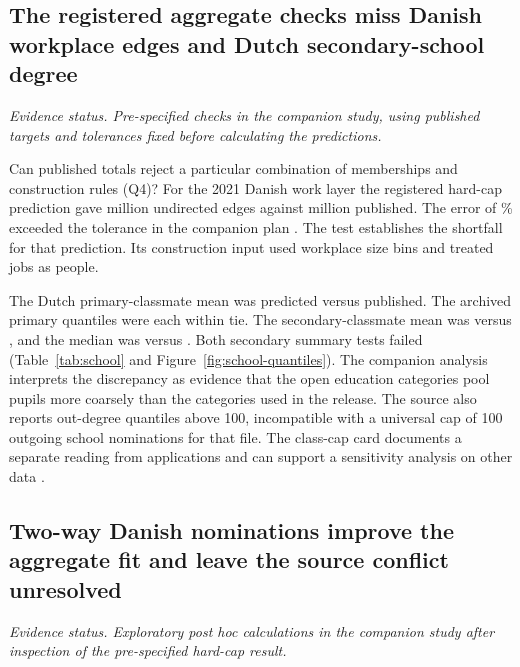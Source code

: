 \subsection{The registered aggregate checks miss Danish workplace edges and Dutch secondary-school degree}
\label{res:registered-aggregates}
\textit{Evidence status. Pre-specified checks in the companion study, using published targets and tolerances fixed before calculating the predictions.}

Can published totals reject a particular combination of memberships and construction rules (Q4)? For the 2021 Danish work layer the registered hard-cap prediction gave \DanishCapped{} million undirected edges against \DanishPublished{} million published. The error of \DanishCappedError\% exceeded the tolerance in the companion plan \citep{cremers2025,almamunpredicting2026}. The test establishes the shortfall for that prediction. Its construction input used workplace size bins and treated jobs as people.

The Dutch primary-classmate mean was \PrimaryMeanPredicted{} predicted versus \PrimaryMeanPublished{} published. The archived primary quantiles were each within \PrimaryMaxQuantileError{} tie. The secondary-classmate mean was \SecondaryMeanPredicted{} versus \SecondaryMeanPublished{}, and the median was \SecondaryMedianPredicted{} versus \SecondaryMedianPublished{}. Both secondary summary tests failed (Table~\ref{tab:school} and Figure~\ref{fig:school-quantiles}). The companion analysis interprets the discrepancy as evidence that the open education categories pool pupils more coarsely than the categories used in the release. The source also reports out-degree quantiles above 100, incompatible with a universal cap of 100 outgoing school nominations for that file. The class-cap card documents a separate reading from applications and can support a sensitivity analysis on other data \citep{vanderlaan2022,bos2022,almamunpredicting2026}.


\subsection{Two-way Danish nominations improve the aggregate fit and leave the source conflict unresolved}
\label{res:ambiguity}
\textit{Evidence status. Exploratory post hoc calculations in the companion study after inspection of the pre-specified hard-cap result.}

